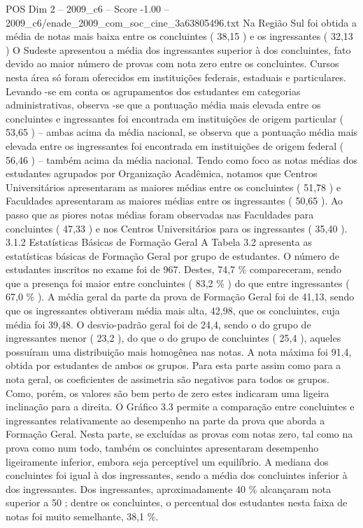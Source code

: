 \begin{textsample}{POS Dim 2 – 2009\_c6 – Score -1.00 – 2009\_c6/enade\_2009\_com\_soc\_cine\_3a63805496.txt}
Na Região Sul foi obtida a média de notas mais baixa entre os concluintes ( 38,15 ) e os ingressantes ( 32,13 ) O Sudeste apresentou a média dos ingressantes superior à dos concluintes, fato devido ao maior número de provas com nota zero entre os concluintes.
Cursos nesta área só foram oferecidos em instituições federais, estaduais e particulares.
Levando -se em conta os agrupamentos dos estudantes em categorias administrativas, observa -se que a pontuação média mais elevada entre os concluintes e ingressantes foi encontrada em instituições de origem particular ( 53,65 ) – ambas acima da média nacional, se observa que a pontuação média mais elevada entre os ingressantes foi encontrada em instituições de origem federal ( 56,46 ) – também acima da média nacional.
Tendo como foco as notas médias dos estudantes agrupados por Organização Acadêmica, notamos que Centros Universitários apresentaram as maiores médias entre os concluintes ( 51,78 ) e Faculdades apresentaram as maiores médias entre os ingressantes ( 50,65 ).
Ao passo que as piores notas médias foram observadas nas Faculdades para concluintes ( 47,33 ) e nos Centros Universitários para os ingressantes ( 35,40 ). 3.1.2 Estatísticas Básicas de Formação Geral A Tabela 3.2 apresenta as estatísticas básicas de Formação Geral por grupo de estudantes.
O número de estudantes inscritos no exame foi de 967.
Destes, 74,7 \% compareceram, sendo que a presença foi maior entre concluintes ( 83,2 \% ) do que entre ingressantes ( 67,0 \% ).
A média geral da parte da prova de Formação Geral foi de 41,13, sendo que os ingressantes obtiveram média mais alta, 42,98, que os concluintes, cuja média foi 39,48.
O desvio-padrão geral foi de 24,4, sendo o do grupo de ingressantes menor ( 23,2 ), do que o do grupo de concluintes ( 25,4 ), aqueles possuíram uma distribuição mais homogênea nas notas.
A nota máxima foi 91,4, obtida por estudantes de ambos os grupos.
Para esta parte assim como para a nota geral, os coeficientes de assimetria são negativos para todos os grupos.
Como, porém, os valores são bem perto de zero estes indicaram uma ligeira inclinação para a direita.
O Gráfico 3.3 permite a comparação entre concluintes e ingressantes relativamente ao desempenho na parte da prova que aborda a Formação Geral.
Nesta parte, se excluídas as provas com notas zero, tal como na prova como num todo, também os concluintes apresentaram desempenho ligeiramente inferior, embora seja perceptível um equilíbrio.
A mediana dos concluintes foi igual à dos ingressantes, sendo a média dos concluintes inferior à dos ingressantes.
Dos ingressantes, aproximadamente 40 \% alcançaram nota superior a 50 ; dentre os concluintes, o percentual dos estudantes nesta faixa de notas foi muito semelhante, 38,1 \%.

\end{textsample}
